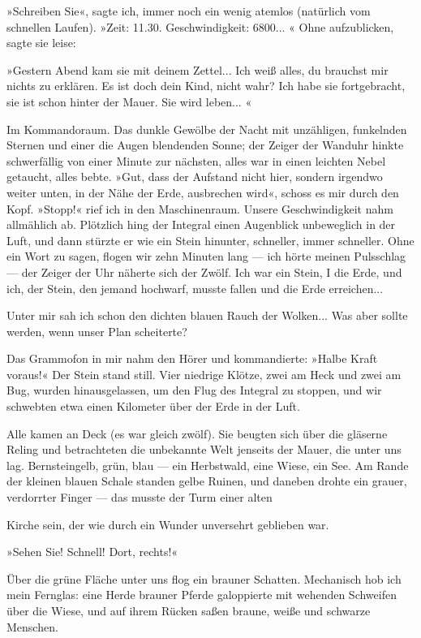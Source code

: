 »Schreiben Sie«, sagte ich, immer noch ein wenig atemlos (natürlich
vom schnellen Laufen). »Zeit: 11.30. Geschwindigkeit: 6800... «
Ohne aufzublicken, sagte sie leise:

»Gestern Abend kam sie mit deinem Zettel... Ich weiß alles, du
brauchst mir nichts zu erklären. Es ist doch dein Kind, nicht wahr?
Ich habe sie fortgebracht, sie ist schon hinter der Mauer. Sie wird
leben... «

Im Kommandoraum. Das dunkle Gewölbe der Nacht mit unzähligen,
funkelnden Sternen und einer die Augen blendenden Sonne; der Zeiger
der Wanduhr hinkte schwerfällig von einer Minute zur nächsten,
alles war in einen leichten Nebel getaucht, alles bebte. »Gut, dass
der Aufstand nicht hier, sondern irgendwo weiter unten, in der Nähe
der Erde, ausbrechen wird«, schoss es mir durch den Kopf. »Stopp!«
rief ich in den Maschinenraum. Unsere Geschwindigkeit nahm
allmählich ab. Plötzlich hing der Integral einen Augenblick
unbeweglich in der Luft, und dann stürzte er wie ein Stein
hinunter, schneller, immer schneller. Ohne ein Wort zu sagen,
flogen wir zehn Minuten lang — ich hörte meinen Pulsschlag — der
Zeiger der Uhr näherte sich der Zwölf. Ich war ein Stein, I die
Erde, und ich, der Stein, den jemand hochwarf, musste fallen und
die Erde erreichen...

Unter mir sah ich schon den dichten blauen Rauch der Wolken... Was
aber sollte werden, wenn unser Plan scheiterte?

Das Grammofon in mir nahm den Hörer und kommandierte: »Halbe Kraft
voraus!« Der Stein stand still. Vier niedrige Klötze, zwei am Heck
und zwei am Bug, wurden hinausgelassen, um den Flug des Integral zu
stoppen, und wir schwebten etwa einen Kilometer über der Erde in
der Luft.

Alle kamen an Deck (es war gleich zwölf). Sie beugten sich über die
gläserne Reling und betrachteten die unbekannte Welt jenseits der
Mauer, die unter uns lag. Bernsteingelb, grün, blau — ein
Herbstwald, eine Wiese, ein See. Am Rande der kleinen blauen Schale
standen gelbe Ruinen, und daneben drohte ein grauer, verdorrter
Finger — das musste der Turm einer alten

Kirche sein, der wie durch ein Wunder unversehrt geblieben war.

»Sehen Sie! Schnell! Dort, rechts!«

Über die grüne Fläche unter uns flog ein brauner Schatten.
Mechanisch hob ich mein Fernglas: eine Herde brauner Pferde
galoppierte mit wehenden Schweifen über die Wiese, und auf ihrem
Rücken saßen braune, weiße und schwarze Menschen.

